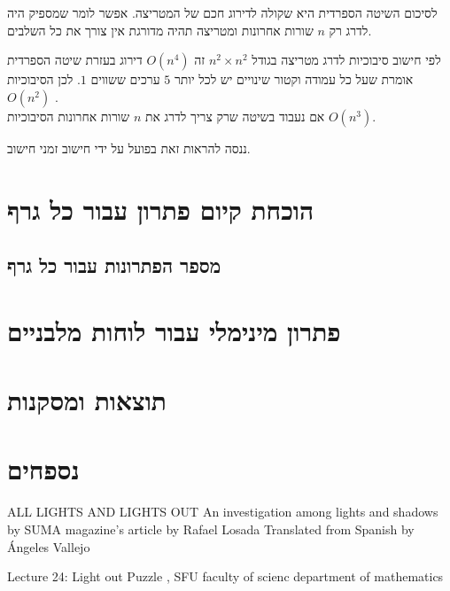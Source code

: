 \documentclass[12pt,twoside]{article}
\begin{document}
לסיכום השיטה הספרדית היא שקולה לדירוג חכם של המטריצה.
אפשר לומר שמספיק היה לדרג רק 
$n$
שורות אחרונות ומטריצה תהיה מדורגת 
אין צורך את כל השלבים.

לפי חישוב סיבוכיות
לדרג מטריצה 
בגודל 
$n^2 \times n^2$
זה 
$O(n^4)$
דירוג בעזרת שיטה הספרדית אומרת
שעל כל עמודה 
וקטור שינויים 
יש לכל יותר
$5$
ערכים ששווים 
$1$.
לכן הסיבוכיות 
$O(n^2)$
.
\\
אם נעבוד בשיטה 
שרק צריך לדרג את
$n$
שורות 
אחרונות
הסיבוכיות 
$O(n^3)$.

ננסה להראות זאת בפועל על ידי חישוב זמני חישוב.

\section{הוכחת  קיום פתרון עבור כל גרף}

\subsection{מספר הפתרונות עבור כל גרף}

\section{פתרון מינימלי עבור לוחות מלבניים}


\section{תוצאות ומסקנות}

\section{נספחים}

\newpage
\begin{thebibliography}{99}
\unsethebrew
{} ALL LIGHTS AND LIGHTS OUT
An investigation among lights and shadows by
SUMA magazine’s article by Rafael Losada
Translated from Spanish by Ángeles Vallejo

 Lecture 24: Light out Puzzle , SFU faculty of scienc department of mathematics
\end{thebibliography}
\end{document}
